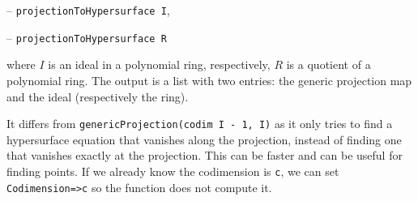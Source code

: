 \documentclass[11pt]{amsart}
\theoremstyle{definition}
\begin{document}
\vspace{0.5em}
-- {\tt projectionToHypersurface I},

-- {\tt projectionToHypersurface R} 
\vspace{0.5em}

\noindent where $I$ is an ideal in a polynomial ring, respectively, $R$ is a quotient of a polynomial ring. The output is
a list with two entries: the generic projection map and the ideal (respectively the ring).

It differs from {\tt genericProjection(codim I - 1, I)} as it only tries to find a hypersurface equation that vanishes along the projection, instead of finding one that vanishes exactly at the projection.  This can be faster and can be useful for finding points.   If we already know the codimension is {\tt c}, we can set {\tt Codimension=>c} so the function does not compute it. 

\begin{comment}~~

  ~~
  
  {{\small\color{blue}
\begin{verbatim}
	i2 : R = ZZ/5[x, y, z];
	
	i3 : I = ideal(random(3, R) - 2, random(2, R));
	
	o3 : Ideal of R
	
	i4 : projectionToHypersurface(I)
	
	            ZZ                             4    3      2 2     4
	o4 = (map(R,--[y, z],{x + 2y, 2y}), ideal(y  + y z - 2y z  - 2z  - y - z))
	            5
	
    o4 : Sequence
	i5 : projectionToHypersurface(R/I)
	
	
	
                           	                    R                    
	o5 = (map(--------------------------------------------------------------
	    3       2     3            2        2       2       2     
	(- x  - 2x*y  - 2y  - x*y*z + y z - 2x*z  + 2y*z  - 2, x  - 2x
	-------------------------------------------------------------------
                                    ZZ                       
	                                    --[y, z]                 
	                                    5                       
	--------------------,----------------------------------------------
	      2               4 2    3 3       5     6     3       2     3 
	*y - y  + x*z - y*z) y z  + y z  - 2y*z  + 2z  + 2y  + 2y*z  + 2z  
	-------------------------------------------------------------------
                    	       ZZ
                	           --[y, z]
	                            5
	---,{x - z, y}), -------------------------------------------------)
	                  4 2    3 3       5     6     3       2     3
	- 1              y z  + y z  - 2y*z  + 2z  + 2y  + 2y*z  + 2z  - 1
	
	o5 : Sequence
	\end{verbatim}
    }}
\end{comment}
\end{document}
